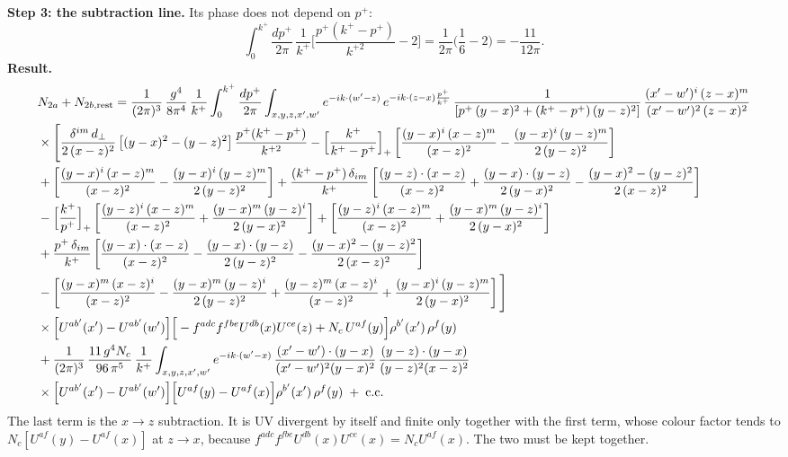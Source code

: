 \documentclass[9pt]{article}
\numberwithin{equation}{section}
\begin{document}
\noindent\textbf{Step 3: the subtraction line.} Its phase does not depend on $p^{+}$:
\begin{equation}
\int_{0}^{k^{+}}\frac{dp^{+}}{2\pi}\,\frac{1}{k^{+}}\Big[\frac{p^{+}(k^{+}-p^{+})}{k^{+2}}-2\Big]=\frac{1}{2\pi}\Big(\frac16-2\Big)=-\frac{11}{12\pi}.
\end{equation}
\textbf{Result.}
\begin{align}
&N_{2a}+N_{2b,\rm rest}=\frac{1}{(2\pi)^{3}}\,\frac{g^{4}}{8\pi^{4}}\,\frac{1}{k^{+}}\int_{0}^{k^{+}}\frac{dp^{+}}{2\pi}\int_{x,y,z,x',w'}e^{-ik\cdot(w'-z)}\,e^{-ik\cdot(z-x)\frac{p^{+}}{k^{+}}}\,\frac{1}{\left[p^{+}\,(y-x)^{2}+(k^{+}-p^{+})\,(y-z)^{2}\right]}\,\frac{(x'-w')^{i}\,(z-x)^{m}}{(x'-w')^{2}\,(z-x)^{2}}\notag\\
&\times\Bigg[\frac{\delta^{im}\,d_{\perp}}{2\,(x-z)^{2}}\left[(y-x)^{2}-(y-z)^{2}\right]\frac{p^{+}(k^{+}-p^{+})}{k^{+2}}
-\Big[\frac{k^{+}}{k^{+}-p^{+}}\Big]_{+}\left[\frac{(y-x)^{i}\,(x-z)^{m}}{(x-z)^{2}}-\frac{(y-x)^{i}\,(y-z)^{m}}{2\,(y-z)^{2}}\right]\notag\\
&+\left[\frac{(y-x)^{i}\,(x-z)^{m}}{(x-z)^{2}}-\frac{(y-x)^{i}\,(y-z)^{m}}{2\,(y-z)^{2}}\right]
+\frac{(k^{+}-p^{+})\,\delta_{im}}{k^{+}}\left[\frac{(y-z)\cdot(x-z)}{(x-z)^{2}}+\frac{(y-x)\cdot(y-z)}{2\,(y-x)^{2}}-\frac{(y-x)^{2}-(y-z)^{2}}{2\,(x-z)^{2}}\right]\notag\\
&-\Big[\frac{k^{+}}{p^{+}}\Big]_{+}\left[\frac{(y-z)^{i}\,(x-z)^{m}}{(x-z)^{2}}+\frac{(y-x)^{m}\,(y-z)^{i}}{2\,(y-x)^{2}}\right]+\left[\frac{(y-z)^{i}\,(x-z)^{m}}{(x-z)^{2}}+\frac{(y-x)^{m}\,(y-z)^{i}}{2\,(y-x)^{2}}\right]\notag\\
&+\frac{p^{+}\,\delta_{im}}{k^{+}}\left[\frac{(y-x)\cdot(x-z)}{(x-z)^{2}}-\frac{(y-x)\cdot(y-z)}{2\,(y-z)^{2}}-\frac{(y-x)^{2}-(y-z)^{2}}{2\,(x-z)^{2}}\right]\notag\\
&-\left[\frac{(y-x)^{m}\,(x-z)^{i}}{(x-z)^{2}}-\frac{(y-x)^{m}\,(y-z)^{i}}{2\,(y-z)^{2}}+\frac{(y-z)^{m}\,(x-z)^{i}}{(x-z)^{2}}+\frac{(y-x)^{i}\,(y-z)^{m}}{2\,(y-x)^{2}}\right]\Bigg]\notag\\
&\times\Big[U^{ab'}(x')-U^{ab'}(w')\Big]\Big[-f^{adc}f^{fbe}U^{db}(x)U^{ce}(z)+N_{c}\,U^{af}(y)\Big]\rho^{b'}(x')\,\rho^{f}(y)\notag\\
&+\frac{1}{(2\pi)^{3}}\,\frac{11\,g^{4}N_{c}}{96\,\pi^{5}}\,\frac{1}{k^{+}}\int_{x,y,z,x',w'}e^{-ik\cdot(w'-x)}\,\frac{(x'-w')\cdot(y-x)}{(x'-w')^{2}(y-x)^{2}}\,\frac{(y-z)\cdot(y-x)}{(y-z)^{2}(x-z)^{2}}\notag\\
&\times\Big[U^{ab'}(x')-U^{ab'}(w')\Big]\Big[U^{af}(y)-U^{af}(x)\Big]\rho^{b'}(x')\,\rho^{f}(y)\;+\;{\rm c.c.}
\end{align}
The last term is the $x\to z$ subtraction. It is UV divergent by itself and finite only together with the first term, whose colour factor tends to $N_{c}[U^{af}(y)-U^{af}(x)]$ at $z\to x$, because $f^{adc}f^{fbe}U^{db}(x)U^{ce}(x)=N_{c}U^{af}(x)$. The two must be kept together.
\end{document}
